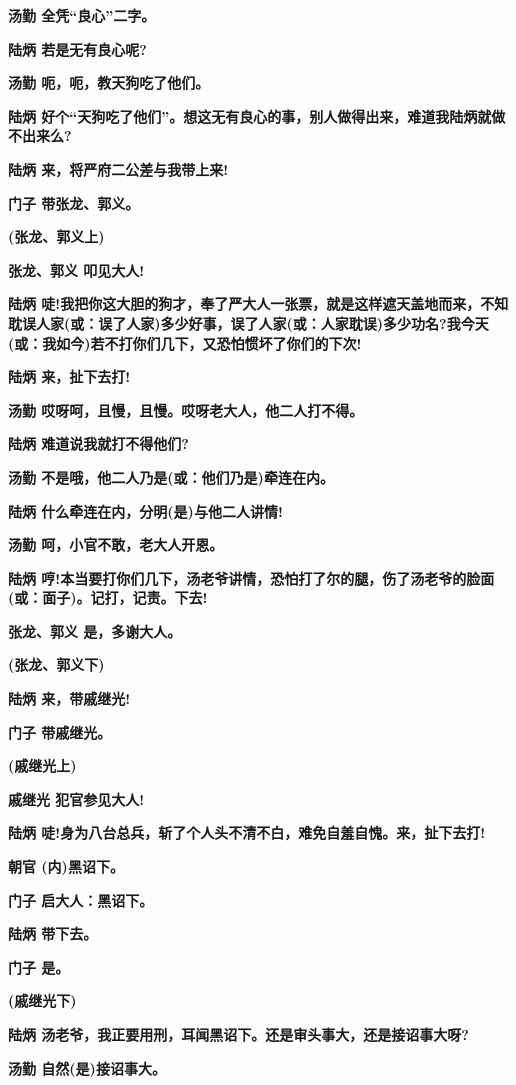 \textbf{汤勤 全凭``良心''二字。}

\textbf{陆炳 若是无有良心呢?}

\textbf{汤勤 呃，呃，教天狗吃了他们。}

\textbf{陆炳
好个``天狗吃了他们''。想这无有良心的事，别人做得出来，难道我陆炳就做不出来么?}

\textbf{陆炳 来，将严府二公差与我带上来!}

\textbf{门子 带张龙、郭义。}

\textbf{(张龙、郭义上)}

\textbf{张龙、郭义 叩见大人!}

\textbf{陆炳
唗!我把你这大胆的狗才，奉了严大人一张票，就是这样遮天盖地而来，不知耽误人家(或：误了人家)多少好事，误了人家(或：人家耽误)多少功名?我今天(或：我如今)若不打你们几下，又恐怕惯坏了你们的下次!}

\textbf{陆炳 来，扯下去打!}

\textbf{汤勤 哎呀呵，且慢，且慢。哎呀老大人，他二人打不得。}

\textbf{陆炳 难道说我就打不得他们?}

\textbf{汤勤 不是哦，他二人乃是(或：他们乃是)牵连在内。}

\textbf{陆炳 什么牵连在内，分明(是)与他二人讲情!}

\textbf{汤勤 呵，小官不敢，老大人开恩。}

\textbf{陆炳
哼!本当要打你们几下，汤老爷讲情，恐怕打了尔的腿，伤了汤老爷的脸面(或：面子)。记打，记责。下去!}

\textbf{张龙、郭义 是，多谢大人。}

\textbf{(张龙、郭义下)}

\textbf{陆炳 来，带戚继光!}

\textbf{门子 带戚继光。}

\textbf{(戚继光上)}

\textbf{戚继光 犯官参见大人!}

\textbf{陆炳
唗!身为八台总兵，斩了个人头不清不白，难免自羞自愧。来，扯下去打!}

\textbf{朝官 (内)黑诏下。}

\textbf{门子 启大人：黑诏下。}

\textbf{陆炳 带下去。}

\textbf{门子 是。}

\textbf{(戚继光下)}

\textbf{陆炳
汤老爷，我正要用刑，耳闻黑诏下。还是审头事大，还是接诏事大呀?}

\textbf{汤勤 自然(是)接诏事大。}

